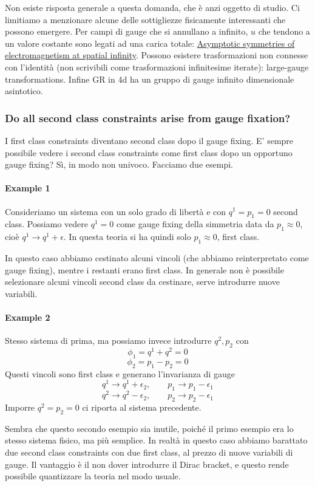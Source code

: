 \documentclass[a4paper, 11pt]{article}
\begin{document}
	Non esiste risposta generale a questa domanda, che è anzi oggetto di studio. Ci limitiamo a menzionare alcune delle sottigliezze fisicamente interessanti che possono emergere. Per campi di gauge che si annullano a infinito, $u$ che tendono a un valore costante sono legati ad una carica totale: \href{https://arxiv.org/pdf/1803.10194.pdf}{Asymptotic symmetries of electromagnetism at spatial infinity}.
	Possono esistere trasformazioni non connesse con l'identità (non scrivibili come trasformazioni infinitesime iterate): large-gauge transformations. Infine GR in 4d ha un gruppo di gauge infinito dimensionale asintotico.
	
	\subsubsection{Do all second class constraints arise from gauge fixation?}
	I first class constraints diventano second class dopo il gauge fixing. E' sempre possibile vedere i second class constraints come first class dopo un opportuno gauge fixing? Sì, in modo non univoco. Facciamo due esempi.
	\paragraph{Example 1} Consideriamo un sistema con un solo grado di libertà e con $q^1=p_1=0$ second class. Possiamo vedere $q^1=0$ come gauge fixing della simmetria data da $p_1\approx 0$, cioè $q^1\rightarrow q^1 + \epsilon$. In questa teoria si ha quindi solo $p_1\approx 0$, first class.
	
	In questo caso abbiamo cestinato alcuni vincoli (che abbiamo reinterpretato come gauge fixing), mentre i restanti erano first class. In generale non è possibile selezionare alcuni vincoli second class da cestinare, serve introdurre nuove variabili.
	\paragraph{Example 2} Stesso sistema di prima, ma possiamo invece introdurre $q^2,p_2$ con
	\[ \phi_1 = q^1+q^2 = 0 \]
	\[ \phi_2 = p_1-p_2 = 0 \]
	Questi vincoli sono first class e generano l'invarianza di gauge
	\[ q^1 \rightarrow q^1 + \epsilon_2,\qquad p_1 \rightarrow p_1 - \epsilon_1 \]
	\[ q^2 \rightarrow q^2 - \epsilon_2,\qquad p_2 \rightarrow p_2 - \epsilon_1 \]
	Imporre $q^2=p_2=0$ ci riporta al sistema precedente.
	
	Sembra che questo secondo esempio sia inutile, poiché il primo esempio era lo stesso sistema fisico, ma più semplice. In realtà in questo caso abbiamo barattato due second class constraints con due first class, al prezzo di nuove variabili di gauge. Il vantaggio è il non dover introdurre il Dirac bracket, e questo rende possibile quantizzare la teoria nel modo usuale.
	
\end{document}
